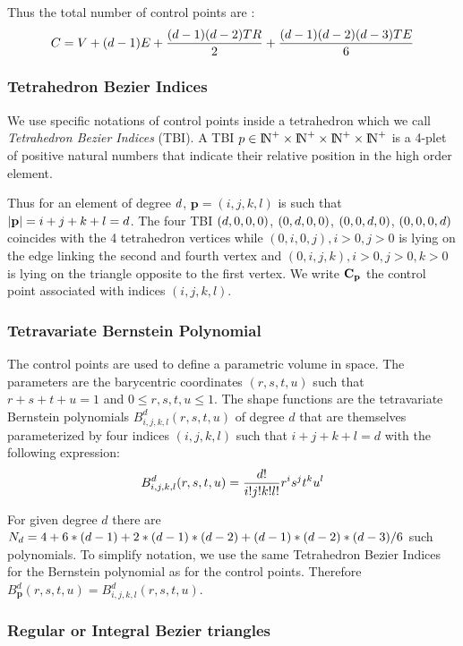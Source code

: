 \documentclass[a4paper,11pt]{article}
\begin{document}
Thus the total number of control points are :
\[
{C}={ V}+({d}-1) { E}+\frac{({d}-1) ({d}-2) { TR}}{2}+\frac{({d}-1) ({d}-2) ({d}-3) { TE}}{6}
\]
\subsubsection{Tetrahedron Bezier Indices}

We use specific notations of control points inside a tetrahedron which we call {\em Tetrahedron Bezier Indices} (TBI).
A TBI $p\in {\rm I\!N}^{+}\times{\rm I\!N}^{+}\times{\rm I\!N}^{+}\times{\rm I\!N}^{+}$ is a 4-plet of positive natural numbers that indicate their relative position in the high order element. 

Thus for an element of degree ${d}$, ${\mathbf p}=(i,j,k,l)$ is such that $|{\mathbf p}|=i+j+k+l={d}$.  The four TBI $({d},0,0,0)$, $(0,{d},0,0)$, $(0,0,{d},0)$, $(0,0,0,{d})$ coincides with the 4 tetrahedron vertices while $(0,i,0,j), i>0, j>0$ is lying on the edge linking the second and fourth vertex and   $(0,i,j,k), i>0, j>0, k>0$ is lying on the triangle opposite to the first vertex. We write ${\mathbf C}_{\mathbf p}$ the control point associated with indices $(i,j,k,l)$.

\subsubsection{Tetravariate Bernstein Polynomial}

The control points are used to define a parametric volume in space. The parameters are the barycentric coordinates $(r,s,t,u)$ such that $r+s+t+u=1$ and $0\leq r,s,t,u \leq 1$. The shape functions are the tetravariate Bernstein polynomials $B^d_{i,j,k,l}(r,s,t,u)$ of degree $d$ that are themselves parameterized by four indices $(i,j,k,l)$ such that $i+j+k+l=d$ with the following expression:
\[
B^{d}_{i,j,k,l}(r,s,t,u)=\frac{{d}!}{i! j! k! l!} r^i s^j t^k u ^l
\]

For given degree $d$ there are $N_d=4+6*({d}-1)+2*({d}-1)*({d}-2)+({d}-1)*({d}-2)*({d}-3)/6$ such polynomials. To simplify notation, we use the same Tetrahedron Bezier Indices for the Bernstein polynomial as for the control points. Therefore $B^d_{\mathbf p}(r,s,t,u)=B^d_{i,j,k,l}(r,s,t,u)$.


\subsubsection{Regular or Integral Bezier triangles}
\end{document}
